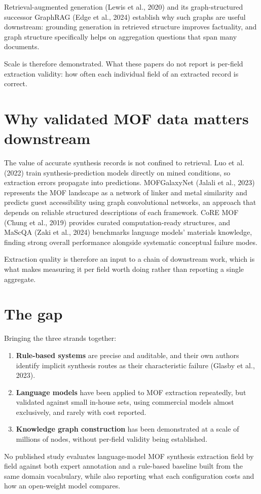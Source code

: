 \documentclass[11pt,a4paper,oneside]{report}
\begin{document}
Retrieval-augmented generation (Lewis et al., 2020) and its graph-structured successor GraphRAG (Edge et al., 2024) establish why such graphs are useful downstream: grounding generation in retrieved structure improves factuality, and graph structure specifically helps on aggregation questions that span many documents.

Scale is therefore demonstrated. What these papers do not report is per-field extraction validity: how often each individual field of an extracted record is correct.

\section{Why validated MOF data matters downstream}

The value of accurate synthesis records is not confined to retrieval. Luo et al. (2022) train synthesis-prediction models directly on mined conditions, so extraction errors propagate into predictions. MOFGalaxyNet (Jalali et al., 2023) represents the MOF landscape as a network of linker and metal similarity and predicts guest accessibility using graph convolutional networks, an approach that depends on reliable structured descriptions of each framework. CoRE MOF (Chung et al., 2019) provides curated computation-ready structures, and MaScQA (Zaki et al., 2024) benchmarks language models' materials knowledge, finding strong overall performance alongside systematic conceptual failure modes.

Extraction quality is therefore an input to a chain of downstream work, which is what makes measuring it per field worth doing rather than reporting a single aggregate.

\section{The gap}

Bringing the three strands together:

\begin{enumerate}
\item \textbf{Rule-based systems} are precise and auditable, and their own authors identify implicit synthesis routes as their characteristic failure (Glasby et al., 2023).
\item \textbf{Language models} have been applied to MOF extraction repeatedly, but validated against small in-house sets, using commercial models almost exclusively, and rarely with cost reported.
\item \textbf{Knowledge graph construction} has been demonstrated at a scale of millions of nodes, without per-field validity being established.
\end{enumerate}
No published study evaluates language-model MOF synthesis extraction field by field against both expert annotation and a rule-based baseline built from the same domain vocabulary, while also reporting what each configuration costs and how an open-weight model compares.
\end{document}

